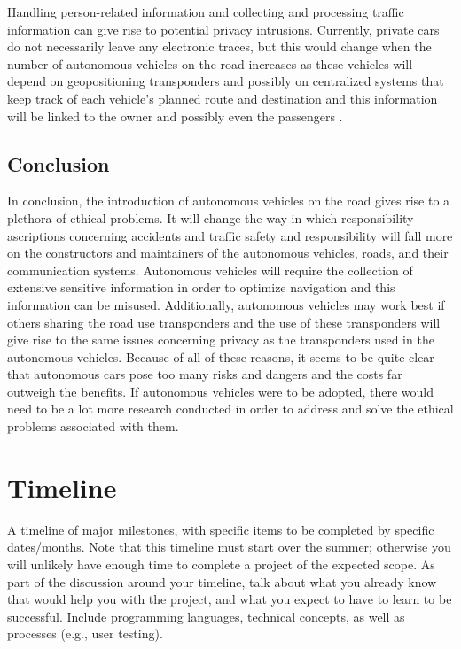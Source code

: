 \documentclass[10pt,twocolumn]{article}
\begin{document}
Handling person-related information and collecting and processing traffic information can give rise to potential privacy intrusions. Currently, private cars do not necessarily leave any electronic traces, but this would change when the number of autonomous vehicles on the road increases as these vehicles will depend on geopositioning transponders and possibly on centralized systems that keep track of each vehicle’s planned route and destination and this information will be linked to the owner and possibly even the passengers \cite{EthicalOverview}.

\subsection{Conclusion}
In conclusion, the introduction of autonomous vehicles on the road gives rise to a plethora of ethical problems. It will change the way in which responsibility ascriptions concerning accidents and traffic safety and responsibility will fall more on the constructors and maintainers of the autonomous vehicles, roads, and their communication systems. Autonomous vehicles will require the collection of extensive sensitive information in order to optimize navigation and this information can be misused. Additionally, autonomous vehicles may work best if others sharing the road use transponders and the use of these transponders will give rise to the same issues concerning privacy as the transponders used in the autonomous vehicles. Because of all of these reasons, it seems to be quite clear that autonomous cars pose too many risks and dangers and the costs far outweigh the benefits. If autonomous vehicles were to be adopted, there would need to be a lot more research conducted in order to address and solve the ethical problems associated with them. 


\section{Timeline}

A timeline of major milestones, with specific items to be completed by specific dates/months.
Note that this timeline must start over the summer; otherwise you will unlikely have enough time to complete a project of the expected scope.
As part of the discussion around your timeline, talk about what you already know that would help you with the project, and what you expect to have to learn to be successful.
Include programming languages, technical concepts, as well as processes (e.g., user testing).

\printbibliography
\end{document}

